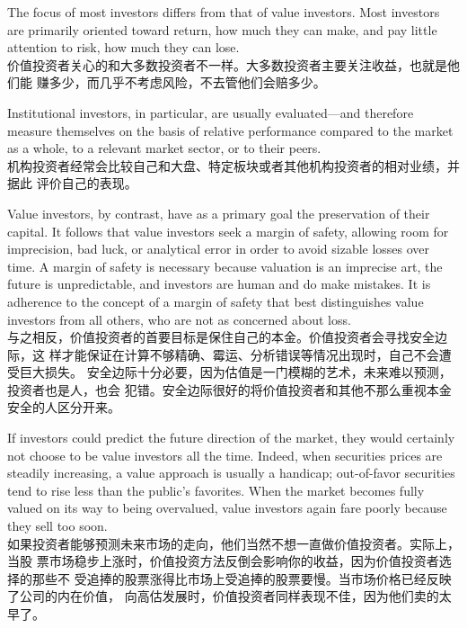 \begin{verseparallel}
  {
    The focus of most investors differs from that of value investors. Most
    investors are primarily oriented toward return, how much they can make, and
    pay little attention to risk, how much they can lose. \\
  }
  {
    价值投资者关心的和大多数投资者不一样。大多数投资者主要关注收益，也就是他们能
    赚多少，而几乎不考虑风险，不去管他们会赔多少。
  }
\end{verseparallel}
\begin{verseparallel}
  {
    Institutional investors, in particular, are usually evaluated—and therefore
    measure themselves on the basis of relative performance compared to the
    market as a whole, to a relevant market sector, or to their peers. \\
  }
  {
    机构投资者经常会比较自己和大盘、特定板块或者其他机构投资者的相对业绩，并据此
    评价自己的表现。
  }
\end{verseparallel}
\begin{verseparallel}
  {
    Value investors, by contrast, have as a primary goal the preservation of
    their capital. It follows that value investors seek a margin of safety,
    allowing room for imprecision, bad luck, or analytical error in order to
    avoid sizable losses over time. A margin of safety is necessary because
    valuation is an imprecise art, the future is unpredictable, and investors
    are human and do make mistakes. It is adherence to the concept of a margin
    of safety that best distinguishes value investors from all others, who are
    not as concerned about loss. \\
  }
  {
    与之相反，价值投资者的首要目标是保住自己的本金。价值投资者会寻找安全边际，这
    样才能保证在计算不够精确、霉运、分析错误等情况出现时，自己不会遭受巨大损失。
    安全边际十分必要，因为估值是一门模糊的艺术，未来难以预测，投资者也是人，也会
    犯错。安全边际很好的将价值投资者和其他不那么重视本金安全的人区分开来。
  }
\end{verseparallel}
\begin{verseparallel}
  {
    If investors could predict the future direction of the market, they would
    certainly not choose to be value investors all the time. Indeed, when
    securities prices are steadily increasing, a value approach is usually a
    handicap; out-of-favor securities tend to rise less than the public's
    favorites. When the market becomes fully valued on its way to being
    overvalued, value investors again fare poorly because they sell too soon. \\
  }
  {
    如果投资者能够预测未来市场的走向，他们当然不想一直做价值投资者。实际上，当股
    票市场稳步上涨时，价值投资方法反倒会影响你的收益，因为价值投资者选择的那些不
    受追捧的股票涨得比市场上受追捧的股票要慢。当市场价格已经反映了公司的内在价值，
    向高估发展时，价值投资者同样表现不佳，因为他们卖的太早了。
  }
\end{verseparallel}
